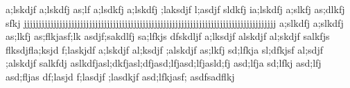                                                                      a;lskdjf a;lskdfj as;lf                                                                                        a;lsdkfj a;lskdfj ;laksdjf l;asdjf sldkfj                                                                                                                           ia;lskdfj a;slkfj as;dlkfj sfkj jjjjjjjjjjjjjjjjjjjjjjjjjjjjjjjjjjjjjjjjjjjjjjjjjjjjjjjjjjjjjjjjjjjjjjjjjjjjjjjjjjjjj                                           a;slkdfj a;slkdfj as;lkfj as;flkjasf;lk asdjf;sakdlfj sa;lfkjs dfskdljf a;lksdjf  alskdjf al;skdjf salkfjs flksdjfla;ksjd f;laskjdf                                                                                                             a;lskdjf al;ksdjf ;alskdjf as;lkfj sd;lfkja sl;dfkjsf                           al;sdjf ;alskdjf salkfdj                                                                                                                                         aslkdfjasl;dkfjasl;dfjasd;lfjasd;lfjasld;fj asd;lfja sd;lfkj asd;lfj asd;fljas df;lasjd f;lasdjf ;lasdkjf asd;lfkjasf; asdfsadflkj                        
